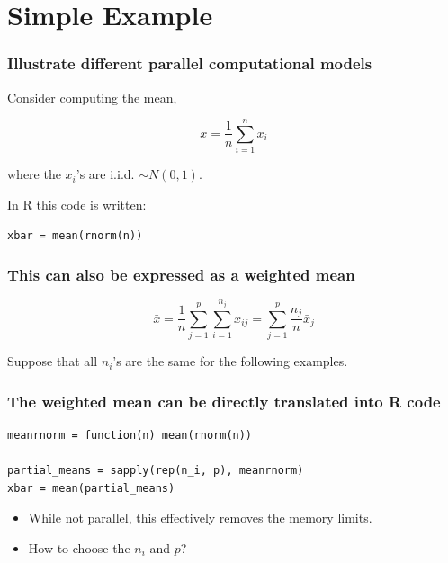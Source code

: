 \documentclass{beamer}
\begin{document}
\section{Simple Example}
\begin{frame}[fragile]

\frametitle{Illustrate different parallel computational models}

Consider computing the mean,

\begin{equation}
    \bar{x} = \frac{1}{n} \sum_{i = 1}^n x_i
\label{eq:mean}
\end{equation}

where the $x_i$'s are i.i.d. $\sim N(0, 1)$. 
    
In R this code is written:

\begin{verbatim}
xbar = mean(rnorm(n))
\end{verbatim}

\end{frame}
\begin{frame}

    \frametitle{This can also be expressed as a weighted mean}

\begin{equation}
    \bar{x} = \frac{1}{n} \sum_{j = 1}^p \sum_{i = 1}^{n_j} x_{ij}
    = \sum_{j = 1}^p \frac{n_j}{n} \bar{x}_j
\label{eq:mean_partial}
\end{equation}

Suppose that all $n_i$'s are the same for the following examples.

\end{frame}
\begin{frame}[fragile]

    \frametitle{The weighted mean can be directly translated into R code}

\begin{verbatim}
meanrnorm = function(n) mean(rnorm(n))

partial_means = sapply(rep(n_i, p), meanrnorm)
xbar = mean(partial_means)
\end{verbatim}

\pause 

    \begin{itemize}
        \item While not parallel, this effectively removes the memory limits.
        \item How to choose the $n_i$ and $p$?
    \end{itemize}

\end{frame}
\end{document}
